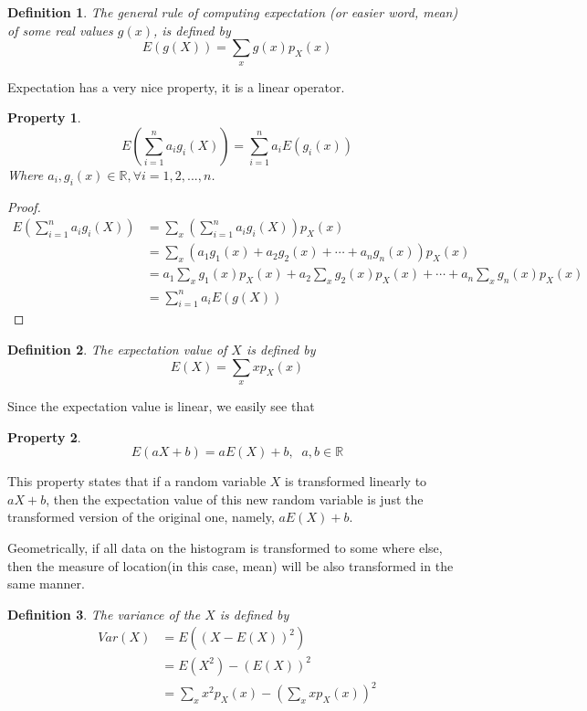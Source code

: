 \documentclass{article}
\newtheorem{definition}{Definition}
\newtheorem{property}{Property}
\begin{document}
\begin{definition}
	The general rule of computing expectation (or easier word, mean) of some real values $g(x)$, is defined by
	\[ E(g(X)) = \sum_x g(x)p_X(x) \] 
\end{definition}

Expectation has a very nice property, it is a linear operator.
\begin{property}
	\[ E\left( \sum_{i=1}^n a_ig_i(X) \right) = \sum_{i=1}^n a_i E(g_i(x))\]
	Where $a_i,g_i(x)\in\mathbb{R}, \forall i=1,2,...,n$.
\end{property}
\begin{proof}
	\begin{align*}
	E\left( \sum_{i=1}^n a_ig_i(X) \right) &= \sum_x \left( \sum_{i=1}^n a_ig_i(X) \right)p_X(x)\\
	&= \sum_x (a_1g_1(x)+a_2g_2(x)+\cdots+a_ng_n(x) )p_X(x)\\
	&= a_1\sum_xg_1(x)p_X(x) + a_2\sum_xg_2(x)p_X(x) + \cdots + a_n\sum_xg_n(x)p_X(x)\\
	&= \sum_{i=1}^n a_iE(g(X))
	\end{align*}
\end{proof}


\begin{definition}
	The expectation value of $X$ is defined by 
	\[ E(X) = \sum_x xp_X(x) \]
\end{definition}

Since the expectation value is linear, we easily see that
\begin{property}
	\[ E(aX+b) = aE(X)+b,\;\;a,b\in\mathbb{R} \]
\end{property}
This property states that if a random variable $X$ is transformed linearly to $aX+b$, then the expectation value of this new random variable is just the transformed version of the original one, namely, $aE(X)+b$.

Geometrically, if all data on the histogram is transformed to some where else, then the measure of location(in this case, mean) will be also transformed in the same manner. \\



\begin{definition}
	The variance of the $X$ is defined by
	\begin{align*}
	Var(X) &= E\left((X-E(X))^2 \right)\\ 
	&= E(X^2) - (E(X))^2\\ 
	&= \sum_x x^2p_X(x) - \left(\sum_x xp_X(x) \right)^2
	\end{align*}
\end{definition}
\end{document}

